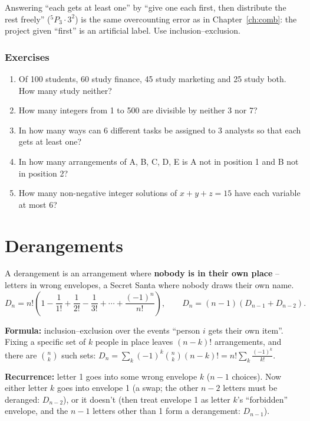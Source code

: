 \documentclass[11pt,a4paper,openany]{report}
\newenvironment{exercises}{\subsection*{Exercises \thechapter}\begin{enumerate}[label=\textbf{\thechapter.\arabic*},leftmargin=3.2em]}{\end{enumerate}}
\newcommand{\C}[2]{\binom{#1}{#2}}
\begin{document}
\begin{trap}
Answering ``each gets at least one'' by ``give one each first, then distribute the rest freely''
($^5P_3\cdot3^2$) is the same overcounting error as in Chapter~\ref{ch:comb}: the project given ``first'' is an
artificial label. Use inclusion--exclusion.
\end{trap}

\begin{exercises}
\item Of 100 students, 60 study finance, 45 study marketing and 25 study both. How many study neither?
\item How many integers from 1 to 500 are divisible by neither 3 nor 7?
\item In how many ways can 6 different tasks be assigned to 3 analysts so that each gets at least one?
\item In how many arrangements of A, B, C, D, E is A not in position 1 and B not in position 2?
\item How many non-negative integer solutions of $x+y+z=15$ have each variable at most 6?
\end{exercises}

\chapter{Derangements}\label{ch:der}

A derangement is an arrangement where \textbf{nobody is in their own place} -- letters in wrong
envelopes, a Secret Santa where nobody draws their own name.
\[D_n=n!\left(1-\frac1{1!}+\frac1{2!}-\frac1{3!}+\cdots+\frac{(-1)^n}{n!}\right),\qquad D_n=(n-1)(D_{n-1}+D_{n-2}).\]

\begin{why}
\textbf{Formula:} inclusion--exclusion over the events ``person $i$ gets their own item''. Fixing a
specific set of $k$ people in place leaves $(n-k)!$ arrangements, and there are $\C nk$ such sets:
$D_n=\sum_k(-1)^k\C nk(n-k)!=n!\sum_k\frac{(-1)^k}{k!}$.

\textbf{Recurrence:} letter 1 goes into some wrong envelope $k$ ($n-1$ choices). Now either letter $k$ goes
into envelope 1 (a swap; the other $n-2$ letters must be deranged: $D_{n-2}$), or it doesn't (then treat
envelope 1 as letter $k$'s ``forbidden'' envelope, and the $n-1$ letters other than 1 form a derangement: $D_{n-1}$).
\end{why}
\end{document}
